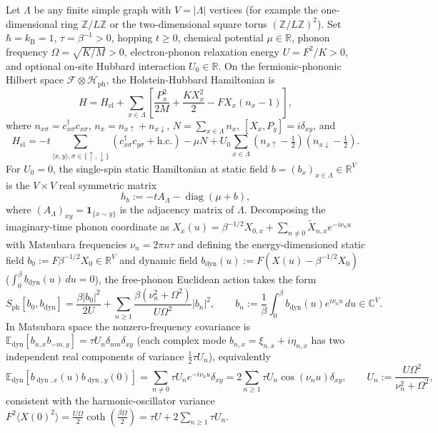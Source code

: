 \documentclass[11pt]{article}
\theoremstyle{definition}
\theoremstyle{remark}
\DeclareMathOperator{\diag}{diag}
\DeclareMathOperator{\dyn}{dyn}
\DeclareMathOperator{\el}{el}
\DeclareMathOperator{\ph}{ph}
\newcommand{\E}{\mathbb{E}}
\newcommand{\R}{\mathbb{R}}
\newcommand{\C}{\mathbb{C}}
\newcommand{\Z}{\mathbb{Z}}
\newcommand{\kB}{k_{\mathrm{B}}}
\begin{document}
Let $\Lambda$ be any finite simple graph with $V = |\Lambda|$ vertices (for example the one-dimensional ring $\Z/L\Z$ or the two-dimensional square torus $(\Z/L\Z)^2$). Set $\hbar = \kB = 1$, $\tau = \beta^{-1} > 0$, hopping $t \ge 0$, chemical potential $\mu \in \R$, phonon frequency $\Omega = \sqrt{K/M} > 0$, electron-phonon relaxation energy $U = F^2/K > 0$, and optional on-site Hubbard interaction $U_0 \in \R$. On the fermionic-phononic Hilbert space $\mathcal{F} \otimes \mathcal{H}_{\ph}$, the Holstein-Hubbard Hamiltonian is
\begin{equation}
H = H_{\el} + \sum_{x \in \Lambda} \left[\frac{P_x^2}{2M} + \frac{K X_x^2}{2} - F X_x (n_x - 1)\right],
\label{eq:H}
\end{equation}
where $n_{x\sigma} = c_{x\sigma}^\dagger c_{x\sigma}$, $n_x = n_{x\uparrow} + n_{x\downarrow}$, $N = \sum_{x\in\Lambda} n_x$, $[X_x, P_y] = i\delta_{xy}$, and
\begin{equation}
H_{\el} = -t \sum_{\langle x,y\rangle, \sigma\in\{\uparrow,\downarrow\}} \left(c_{x\sigma}^\dagger c_{y\sigma} + \mathrm{h.c.}\right) - \mu N + U_0 \sum_{x \in \Lambda} \left(n_{x\uparrow}-\tfrac{1}{2}\right)\left(n_{x\downarrow}-\tfrac{1}{2}\right).
\label{eq:Hel}
\end{equation}
For $U_0 = 0$, the single-spin static Hamiltonian at static field $b = (b_x)_{x\in\Lambda} \in \R^V$ is the $V \times V$ real symmetric matrix
\begin{equation}
h_b := -t A_\Lambda - \diag(\mu + b),
\label{eq:hb}
\end{equation}
where $(A_\Lambda)_{xy} = \mathbf{1}_{\{x\sim y\}}$ is the adjacency matrix of $\Lambda$. Decomposing the imaginary-time phonon coordinate as $X_x(u) = \beta^{-1/2} X_{0,x} + \sum_{n \neq 0} \widetilde{X}_{n,x} e^{-i\nu_n u}$ with Matsubara frequencies $\nu_n = 2\pi n \tau$ and defining the energy-dimensioned static field $b_0 := F \beta^{-1/2} X_0 \in \R^V$ and dynamic field $b_{\dyn}(u) := F(X(u) - \beta^{-1/2}X_0)$ ($\int_0^\beta b_{\dyn}(u)\,du = 0$), the free-phonon Euclidean action takes the form
\begin{equation}
S_{\ph}[b_0, b_{\dyn}] = \frac{\beta |b_0|^2}{2U} + \sum_{n \ge 1} \frac{\beta (\nu_n^2 + \Omega^2)}{U \Omega^2} |b_n|^2,
\qquad b_n := \frac{1}{\beta}\int_0^\beta b_{\dyn}(u) e^{i\nu_n u}\,du \in \C^V.
\label{eq:Sph}
\end{equation}
In Matsubara space the nonzero-frequency covariance is $\E_{\dyn}[b_{n,x} b_{-m,y}] = \tau U_n \delta_{nm}\delta_{xy}$ (each complex mode $b_{n,x} = \xi_{n,x} + i\eta_{n,x}$ has two independent real components of variance $\frac{1}{2}\tau U_n$), equivalently
\begin{equation}
\E_{\dyn}[b_{\dyn,x}(u) b_{\dyn,y}(0)] = \sum_{n\neq 0} \tau U_n e^{-i\nu_n u}\delta_{xy} = 2\sum_{n \ge 1} \tau U_n \cos(\nu_n u)\delta_{xy}, \qquad U_n := \frac{U\Omega^2}{\nu_n^2 + \Omega^2},
\label{eq:Un}
\end{equation}
consistent with the harmonic-oscillator variance $F^2\langle X(0)^2\rangle = \frac{U\Omega}{2}\coth(\frac{\beta\Omega}{2}) = \tau U + 2\sum_{n\ge 1}\tau U_n$.
\end{document}

